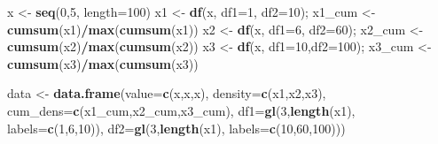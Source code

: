 \documentclass[]{book}
\newenvironment{Shaded}{\begin{snugshade}}{\end{snugshade}}
\newcommand{\KeywordTok}[1]{\textcolor[rgb]{0.13,0.29,0.53}{\textbf{#1}}}
\newcommand{\DataTypeTok}[1]{\textcolor[rgb]{0.13,0.29,0.53}{#1}}
\newcommand{\DecValTok}[1]{\textcolor[rgb]{0.00,0.00,0.81}{#1}}
\newcommand{\StringTok}[1]{\textcolor[rgb]{0.31,0.60,0.02}{#1}}
\newcommand{\OperatorTok}[1]{\textcolor[rgb]{0.81,0.36,0.00}{\textbf{#1}}}
\newcommand{\NormalTok}[1]{#1}
\begin{document}
\begin{Shaded}
\begin{Highlighting}[]
\NormalTok{x <-}\StringTok{ }\KeywordTok{seq}\NormalTok{(}\DecValTok{0}\NormalTok{,}\DecValTok{5}\NormalTok{, }\DataTypeTok{length=}\DecValTok{100}\NormalTok{)}
\NormalTok{x1 <-}\StringTok{ }\KeywordTok{df}\NormalTok{(x, }\DataTypeTok{df1=}\DecValTok{1}\NormalTok{, }\DataTypeTok{df2=}\DecValTok{10}\NormalTok{); x1_cum <-}\StringTok{ }\KeywordTok{cumsum}\NormalTok{(x1)}\OperatorTok{/}\KeywordTok{max}\NormalTok{(}\KeywordTok{cumsum}\NormalTok{(x1))}
\NormalTok{x2 <-}\StringTok{ }\KeywordTok{df}\NormalTok{(x, }\DataTypeTok{df1=}\DecValTok{6}\NormalTok{, }\DataTypeTok{df2=}\DecValTok{60}\NormalTok{); x2_cum <-}\StringTok{ }\KeywordTok{cumsum}\NormalTok{(x2)}\OperatorTok{/}\KeywordTok{max}\NormalTok{(}\KeywordTok{cumsum}\NormalTok{(x2))}
\NormalTok{x3 <-}\StringTok{ }\KeywordTok{df}\NormalTok{(x, }\DataTypeTok{df1=}\DecValTok{10}\NormalTok{,}\DataTypeTok{df2=}\DecValTok{100}\NormalTok{); x3_cum <-}\StringTok{ }\KeywordTok{cumsum}\NormalTok{(x3)}\OperatorTok{/}\KeywordTok{max}\NormalTok{(}\KeywordTok{cumsum}\NormalTok{(x3))}

\NormalTok{data <-}\StringTok{ }\KeywordTok{data.frame}\NormalTok{(}\DataTypeTok{value=}\KeywordTok{c}\NormalTok{(x,x,x),}
                   \DataTypeTok{density=}\KeywordTok{c}\NormalTok{(x1,x2,x3),}
                   \DataTypeTok{cum_dens=}\KeywordTok{c}\NormalTok{(x1_cum,x2_cum,x3_cum),}
                   \DataTypeTok{df1=}\KeywordTok{gl}\NormalTok{(}\DecValTok{3}\NormalTok{,}\KeywordTok{length}\NormalTok{(x1),}
                       \DataTypeTok{labels=}\KeywordTok{c}\NormalTok{(}\DecValTok{1}\NormalTok{,}\DecValTok{6}\NormalTok{,}\DecValTok{10}\NormalTok{)),}
                   \DataTypeTok{df2=}\KeywordTok{gl}\NormalTok{(}\DecValTok{3}\NormalTok{,}\KeywordTok{length}\NormalTok{(x1),}
                        \DataTypeTok{labels=}\KeywordTok{c}\NormalTok{(}\DecValTok{10}\NormalTok{,}\DecValTok{60}\NormalTok{,}\DecValTok{100}\NormalTok{)))}


\end{Highlighting}
\end{Shaded}
\end{document}
